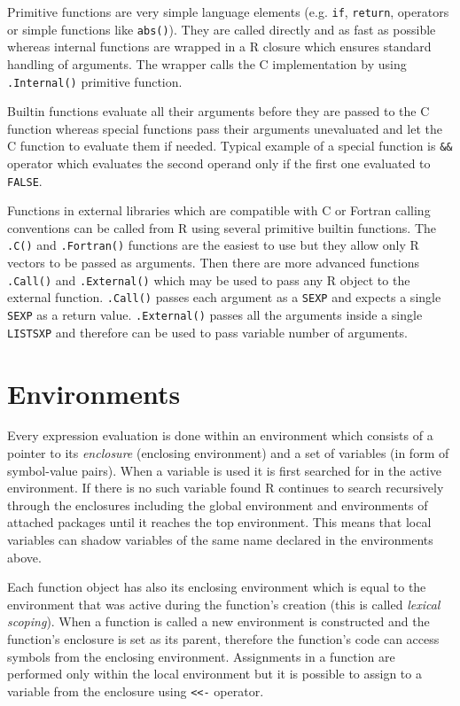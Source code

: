 \documentclass[thesis=M,english,hidelinks]{FITthesis}[2012/10/20]
\begin{document}
	Primitive functions are very simple language elements (e.g. \lstinline|if|, \lstinline|return|, operators or simple functions like \lstinline|abs()|). They are called directly and as fast as possible whereas internal functions are wrapped in a R closure which ensures standard handling of arguments. The wrapper calls the C implementation by using \lstinline|.Internal()| primitive function.\par
	
	Builtin functions evaluate all their arguments before they are passed to the C function whereas special functions pass their arguments unevaluated and let the C function to evaluate them if needed. Typical example of a special function is \lstinline|&&| operator which evaluates the second operand only if the first one evaluated to \lstinline|FALSE|.\par
	
	Functions in external libraries which are compatible with C or Fortran calling conventions can be called from R using several primitive builtin functions. The \lstinline|.C()| and \lstinline|.Fortran()| functions are the easiest to use but they allow only R vectors to be passed as arguments. Then there are more advanced functions \lstinline|.Call()| and \lstinline|.External()| which may be used to pass any R object to the external function. \lstinline|.Call()| passes each argument as a \lstinline|SEXP| and expects a single \lstinline|SEXP| as a return value. \lstinline|.External()| passes all the arguments inside a single \lstinline|LISTSXP| and therefore can be used to pass variable number of arguments.\par

	\section{Environments}
	Every expression evaluation is done within an environment which consists of a pointer to its \emph{enclosure} (enclosing environment) and a set of variables (in form of symbol-value pairs). When a variable is used it is first searched for in the active environment. If there is no such variable found R continues to search recursively through the enclosures including the global environment and environments of attached packages until it reaches the top environment. This means that local variables can shadow variables of the same name declared in the environments above.\par
	
	Each function object has also its enclosing environment which is equal to the environment that was active during the function's creation (this is called \emph{lexical scoping}). When a function is called a new environment is constructed and the function's enclosure is set as its parent, therefore the function's code can access symbols from the enclosing environment. Assignments in a function are performed only within the local environment but it is possible to assign to a variable from the enclosure using \lstinline|<<-| operator.\par
	
\end{document}
